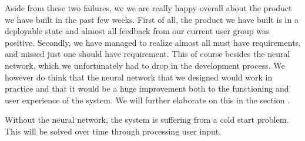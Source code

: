 Aside from these two failures, we we are really happy overall about the product we have built in the past few weeks.
First of all, the product we have built is in a deployable state and almost all feedback from our current user group was positive.
Secondly, we have managed to realize almost all must have requirements, and missed just one should have requirement.
This of course besides the neural network, which we unfortunately had to drop in the development process.
We however do think that the neural network that we designed would work in practice and that it would be a huge improvement both to the functioning and user experience of the system.
We will further elaborate on this in the section .

Without the neural network, the system is suffering from a cold start problem.
This will be solved over time through processing user input.
